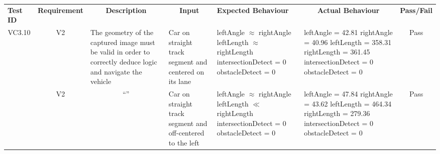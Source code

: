 \documentclass [10pt]{article}
\begin{document}
  \begin{longtable}{ | p{ } | p{ } |  p{ } |  p{ } | p{ } | p{ } |  p{ } |}  \hline

    \rowcolor{subsectionC}\textbf{Test ID} 
    & \multicolumn{1}{c|}{\textbf{Requirement} }
    & \multicolumn{1}{c|}{\textbf{Description} }
    & \multicolumn{1}{c|}{\textbf{Input} }
    & \textbf{Expected Behaviour} 
    & \multicolumn{1}{c|}{\textbf{Actual Behaviour} }
    & \textbf{Pass/Fail} \\  

    
    \multicolumn{1}{|c|}{VC3.10} 
    & \multicolumn{1}{c|}{V2}
    & The geometry of the captured image must be valid in order to correctly deduce logic and navigate the vehicle
    & Car on straight track segment and centered on its lane
    & leftAngle $\approx$ rightAngle \newline
      leftLength $\approx$ rightLength \newline
      intersectionDetect = 0 \newline
      obstacleDetect = 0
    & leftAngle = 42.81 \newline
      rightAngle = 40.96 \newline
      leftLength = 358.31 \newline
      rightLength = 361.45 \newline
      intersectionDetect = 0 \newline
      obstacleDetect = 0 
    & \multicolumn{1}{c|}{Pass}\\ \hline
    
    
    \rowcolor{tableCell}\multicolumn{1}{|c|}{VC3.11} 
    & \multicolumn{1}{c|}{V2}
    & \multicolumn{1}{c|}{``''}
    & Car on straight track segment and off-centered to the left
    & leftAngle $\approx$ rightAngle \newline
      leftLength $\ll$ rightLength \newline
      intersectionDetect = 0 \newline
      obstacleDetect = 0
    & leftAngle = 47.84 \newline
      rightAngle = 43.62 \newline
      leftLength = 464.34 \newline
      rightLength = 279.36 \newline
      intersectionDetect = 0 \newline
      obstacleDetect = 0 
    & \multicolumn{1}{c|}{Pass}\\ \hline
    

\end{longtable}
\end{document}
